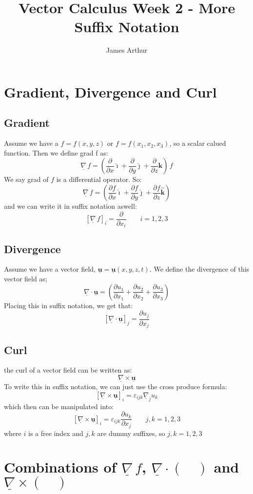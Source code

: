 \documentclass{article}
\title{Vector Calculus Week 2 - More Suffix Notation}
\author{James Arthur}
\renewcommand{\vec}[1]{\underline{\textbf{#1}}}
\newcommand{\veci}{\bm{\hat{\imath}}}
\newcommand{\vecj}{\bm{\hat{\jmath}}}
\newcommand{\veck}{\bm{\hat{k}}}
\newcommand{\e}{\varepsilon}
\newcommand{\nab}{\underline{\nabla}}
\newcommand{\grad}{{\nab}\, f}
\newcommand{\pd}[2]{\frac{\partial #1}{\partial #2}}
\renewcommand{\div}[1]{\nab \cdot #1}
\newcommand{\curl}[1]{\nab \times #1}
\begin{document}
\maketitle
\tableofcontents\newpage



\section{Gradient, Divergence and Curl}
\subsection{Gradient}

Assume we have a $f = f(x, y, z)$ or $f = f(x_1,x_2,x_3)$, so a scalar calued function. Then we define grad f as:
$$ \grad = \left(\pd{}{x}\veci + \pd{}{y}\vecj + \pd{}{z}\veck \right)\, f$$
We say grad of $f$ is a differential operator. So:
$$ \grad = \left(\pd{f}{x}\veci + \pd{f}{y}\vecj + \pd{f}{z}\veck \right) $$
and we can write it in suffix notation aswell:
$$ \left[ \grad \right]_i = \pd{}{x_i} \qquad i = 1, 2, 3$$

\subsection{Divergence}

Assume we have a vector field, $\vec{u} = \vec{u} (x, y, z, t)$. We define the divergence of this vector field as;
$$ \nab \cdot \vec{u} = \left(\pd{u_1}{x_1} + \pd{u_2}{x_2} + \pd{u_3}{x_3}\right)$$
Placing this in suffix notation, we get that:
$$ [\nab \cdot \vec{u}]_j = \pd{u_j}{x_j} $$

\subsection{Curl}

the curl of a vector field can be written as:
$$ \nab \times \vec{u} $$
To write this in suffix notation, we can just use the cross produce formula:
$$ [\nab \times \vec{u}]_i = \e_{ijk} \nab_j u_k $$
which then can be manipulated into:
$$ [\nab \times \vec{u}]_i = \e_{ijk} \pd{u_k}{x_j} \qquad j,k = 1, 2, 3 $$
where $i$ is a free index and $j, k$ are dummy suffixes, so $j, k = 1, 2, 3$

\section{Combinations of $\grad$, $\div(\quad)$ and $\curl(\quad)$}
\end{document}
